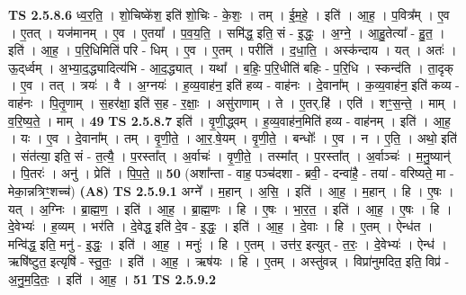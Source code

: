 \documentclass[17pt]{extarticle}
\begin{document}
                  \newline
                                \textbf{ TS 2.5.8.6} \newline
                  ध्व॒र॒ति॒ । शो॒चिष्के॑श॒ इति॑ शो॒चिः - के॒शः॒ । तम् । ई॒म॒हे॒ । इति॑ । आ॒ह॒ । प॒वित्र᳚म् । ए॒व । ए॒तत् । यज॑मानम् । ए॒व । ए॒तया᳚ । प॒व॒य॒ति॒ । समि॑द्ध॒ इति॒ सं - इ॒द्धः॒ । अ॒ग्ने॒ । आ॒हु॒तेत्या᳚ - हु॒त॒ । इति॑ । आ॒ह॒ । प॒रि॒धिमिति॑ परि - धिम् । ए॒व । ए॒तम् । परीति॑ । द॒धा॒ति॒ । अस्क॑न्दाय । यत् । अतः॑ । ऊ॒द्‌र्ध्वम् । अ॒भ्या॒द॒द्ध्यादित्य॑भि - आ॒द॒द्ध्यात् । यथा᳚ । ब॒हिः॒ प॒रि॒धीति॑ बहिः - प॒रि॒धि । स्कन्द॑ति । ता॒दृक् । ए॒व । तत् । त्रयः॑ । वै । अ॒ग्नयः॑ । ह॒व्य॒वाह॑न॒ इति॑ हव्य - वाह॑नः । दे॒वाना᳚म् । क॒व्य॒वाह॑न॒ इति॑ कव्य - वाह॑नः । पि॒तृ॒णाम् । स॒हर॑क्षा॒ इति॑ स॒ह - र॒क्षाः॒ । असु॑राणाम् । ते । ए॒तर्.हि॑ । एति॑ । शꣳ॒॒स॒न्ते॒ । माम् । व॒रि॒ष्य॒ते॒ । माम् । \textbf{  49} \newline
                  \newline
                                \textbf{ TS 2.5.8.7} \newline
                  इति॑ । वृ॒णी॒द्ध्वम् । ह॒व्य॒वाह॑न॒मिति॑ हव्य - वाह॑नम् । इति॑ । आ॒ह॒ । यः । ए॒व । दे॒वाना᳚म् । तम् । वृ॒णी॒ते॒ । आ॒र॒.षे॒यम् । वृ॒णी॒ते॒ । बन्धोः᳚ । ए॒व । न । ए॒ति॒ । अथो॒ इति॑ । संत॑त्या॒ इति॒ सं - त॒त्यै॒ । प॒रस्ता᳚त् । अ॒र्वाचः॑ । वृ॒णी॒ते॒ । तस्मा᳚त् । प॒रस्ता᳚त् । अ॒र्वाञ्चः॑ । म॒नु॒ष्यान्॑ । पि॒तरः॑ । अनु॑ । प्रेति॑ । पि॒प॒ते॒ ॥ \textbf{  50} \newline
                  \newline
                      (अशा᳚न्ता - वाह॒ पञ्च॑दशा - ब्रवी॒ - दन्वा॑है॒ - तया॑ - वरिष्यते॒ मा - मेका॒न्नत्रिꣳ॒॒शच्च॑)  \textbf{(A8)} \newline \newline
                                \textbf{ TS 2.5.9.1} \newline
                  अग्ने᳚ । म॒हान् । अ॒सि॒ । इति॑ । आ॒ह॒ । म॒हान् । हि । ए॒षः । यत् । अ॒ग्निः । ब्रा॒ह्म॒ण॒ । इति॑ । आ॒ह॒ । ब्रा॒ह्म॒णः । हि । ए॒षः । भा॒र॒त॒ । इति॑ । आ॒ह॒ । ए॒षः । हि । दे॒वेभ्यः॑ । ह॒व्यम् । भर॑ति । दे॒वेद्ध॒ इति॑ दे॒व - इ॒द्धः॒ । इति॑ । आ॒ह॒ । दे॒वाः । हि । ए॒तम् । ऐन्ध॑त । मन्वि॑द्ध॒ इति॒ मनु॑ - इ॒द्धः॒ । इति॑ । आ॒ह॒ । मनुः॑ । हि । ए॒तम् । उत्त॑र॒ इत्युत् - त॒रः॒ । दे॒वेभ्यः॑ । ऐन्ध॑ । ऋषि॑ष्टुत॒ इत्यृषि॑ - स्तु॒तः॒ । इति॑ । आ॒ह॒ । ऋष॑यः । हि । ए॒तम् । अस्तु॑वन्न् । विप्रा॑नुमदित॒ इति॒ विप्र॑ - अ॒नु॒म॒दि॒तः॒ । इति॑ । आ॒ह॒ । \textbf{  51} \newline
                  \newline
                                \textbf{ TS 2.5.9.2} \newline
\end{document}
